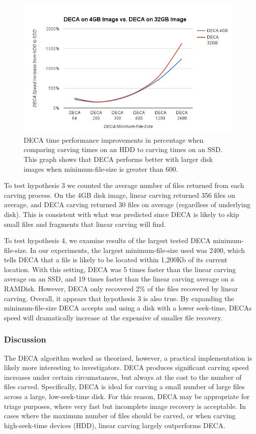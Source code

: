 \documentclass[10pt,a4paper]{article}
\begin{document}
\begin{figure}
	\includegraphics[width=\textwidth]{figures/4GBv32GB.png}
	\caption{DECA time performance improvements in percentage when comparing carving times on an HDD to carving times on an SSD. This graph shows that DECA performs better with larger disk images when minimum-file-size is greater than 600.}
	\label{fig:4v32}
\end{figure}

To test hypothesis 3 we counted the average number of files returned from each carving process. On the 4GB disk image, linear carving returned 356 files on average, and DECA carving returned 30 files on average (regardless of underlying disk). This is consistent with what was predicted since DECA is likely to skip small files and fragments that linear carving will find.

To test hypothesis 4, we examine results of the largest tested DECA minimum-file-size. In our experiments, the largest minimum-file-size used was 2400, which tells DECA that a file is likely to be located within 1,200Kb of its current location. With this setting, DECA was 5 times faster than the linear carving average on an SSD, and 19 times faster than the linear carving average on a RAMDisk. However, DECA only recovered 2\% of the files recovered by linear carving. Overall, it appears that hypothesis 3 is also true. By expanding the minimum-file-size DECA accepts and using a disk with a lower seek-time, DECAs speed will dramatically increase at the expensive of smaller file recovery.

\subsubsection{Discussion}
The DECA algorithm worked as theorized, however, a practical implementation is likely more interesting to investigators. DECA produces significant carving speed increases under certain circumstances, but always at the cost to the number of files carved. Specifically, DECA is ideal for carving a small number of large files across a large, low-seek-time disk. For this reason, DECA may be appropriate for triage purposes, where very fast but incomplete image recovery is acceptable. In cases where the maximum number of files should be carved, or when carving high-seek-time devices (HDD), linear carving largely outperforms DECA.
\end{document}
